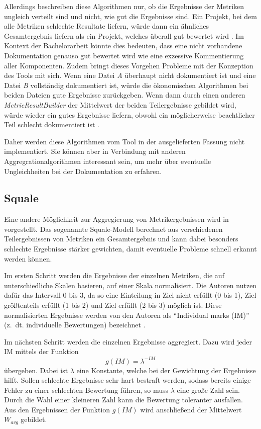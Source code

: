  Allerdings beschreiben diese Algorithmen nur, ob die Ergebnisse der Metriken ungleich verteilt sind und nicht, wie gut die Ergebnisse sind. Ein Projekt, bei dem alle Metriken schlechte Resultate liefern, würde dann ein ähnliches Gesamtergebnis liefern als ein Projekt, welches überall gut bewertet wird \cite[S. 1121]{Softwarequalitymetricsaggregationinindustry}.  Im Kontext der Bachelorarbeit könnte dies bedeuten, dass eine nicht vorhandene Dokumentation genauso gut bewertet wird wie eine exzessive Kommentierung aller Komponenten. Zudem bringt dieses Vorgehen Probleme mit der Konzeption des Tools mit sich. Wenn eine Datei \textit{A} überhaupt nicht dokumentiert ist und eine Datei \textit{B} vollständig dokumentiert ist, würde die ökonomischen Algorithmen bei beiden Dateien gute Ergebnisse zurückgeben. Wenn dann durch einen anderen \textit{MetricResultBuilder} der Mittelwert der beiden Teilergebnisse gebildet wird, würde wieder ein gutes Ergebnisse liefern, obwohl ein möglicherweise beachtlicher Teil schlecht dokumentiert ist .
 
 Daher werden diese Algorithmen vom Tool in der ausgelieferten Fassung nicht implementiert. Sie können aber in Verbindung mit anderen Aggregrationalgorithmen interessant sein, um mehr über eventuelle Ungleichheiten bei der Dokumentation zu erfahren.
 
 \subsection{Squale}
 Eine andere Möglichkeit zur Aggregierung von Metrikergebnissen wird in \cite[S. 1124]{Softwarequalitymetricsaggregationinindustry} vorgestellt. Das sogenannte Squale-Modell berechnet aus verschiedenen Teilergebnissen von Metriken ein Gesamtergebnis und kann dabei besonders schlechte Ergebnisse stärker gewichten, damit eventuelle Probleme schnell erkannt werden können. 
 
 Im ersten Schritt werden die Ergebnisse der einzelnen Metriken, die auf unterschiedliche Skalen basieren, auf einer Skala normalisiert. Die Autoren nutzen dafür das Intervall 0 bis 3, da so eine Einteilung in Ziel nicht erfüllt (0 bis 1), Ziel größtenteils erfüllt (1 bis 2) und Ziel erfüllt (2 bis 3) möglich ist. Diese normalisierten Ergebnisse werden von den Autoren als \enquote{Individual marks (IM)} (z.~dt. individuelle Bewertungen) bezeichnet \cite[S. 142]{AnEmpiricalModelforContinuousandWeightedMetricAggregation}. 
 
 Im nächsten Schritt werden die einzelnen Ergebnisse aggregiert. Dazu wird jeder IM mittels der Funktion
 \begin{equation}
     g(IM)=\lambda^{-IM}
 \end{equation} übergeben. Dabei ist $\lambda$ eine Konstante, welche bei der Gewichtung der Ergebnisse hilft. Sollen schlechte Ergebnisse sehr hart bestraft werden, sodass bereits einige Fehler zu einer schlechten Bewertung führen, so muss $\lambda$ eine große Zahl sein. Durch die Wahl einer kleineren Zahl kann die Bewertung toleranter ausfallen. Aus den Ergebnissen der Funktion $g(IM)$ wird anschließend der Mittelwert $W_{avg}$ gebildet.
 
